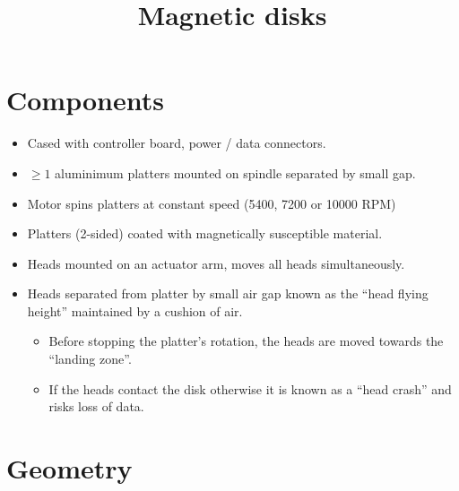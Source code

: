 \documentclass[slides]{pgnotes}
\title{Magnetic disks}
\begin{document}
\maketitle

\section{Components}
\label{sec:components}

\begin{minipage}{0.4\linewidth}
\end{minipage}
\begin{minipage}{0.59\linewidth}
\begin{itemize}
\item
  Cased with controller board, power / data connectors.
\item
  $\ge 1$ aluminimum platters mounted on spindle separated by small gap.
\item
  Motor spins platters at constant speed (5400, 7200 or 10000 RPM)
\item
  Platters (2-sided) coated with magnetically susceptible material.
\item
  Heads mounted on an actuator arm, moves all heads simultaneously.
\item
  Heads separated from platter by small air gap known as the
  ``head flying height'' maintained by a cushion of air.

  \begin{itemize}
  \item
    Before stopping the platter's rotation, the heads are moved towards
    the ``landing zone''.
  \item
    If the heads contact the disk otherwise it is known as a ``head
    crash'' and risks loss of data.
  \end{itemize}
\end{itemize}
\end{minipage}

\section{Geometry}
\label{sec:geometry}
\end{document}
